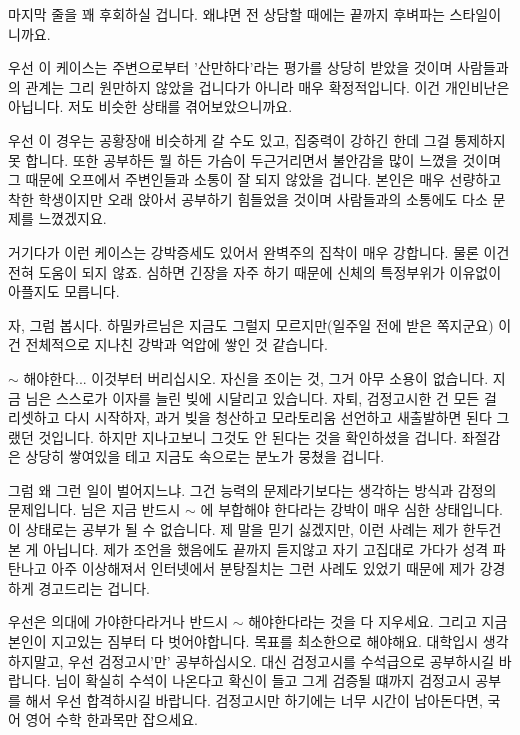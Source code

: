 마지막 줄을 꽤 후회하실 겁니다. 왜냐면 전 상담할 때에는 끝까지 후벼파는 스타일이니까요.
\vspace{5mm}

우선 이 케이스는 주변으로부터 '산만하다'라는 평가를 상당히 받았을 것이며
사람들과의 관계는 그리 원만하지 않았을 겁니다가 아니라 매우 확정적입니다.
이건 개인비난은 아닙니다. 저도 비슷한 상태를 겪어보았으니까요.
\vspace{5mm}

우선 이 경우는 공황장애 비슷하게 갈 수도 있고, 집중력이 강하긴 한데 그걸 통제하지 못 합니다.
또한 공부하든 뭘 하든 가슴이 두근거리면서 불안감을 많이 느꼈을 것이며 그 때문에 오프에서 주변인들과 소통이 잘 되지 않았을 겁니다.
본인은 매우 선량하고 착한 학생이지만 오래 앉아서 공부하기 힘들었을 것이며 사람들과의 소통에도 다소 문제를 느꼈겠지요.
\vspace{5mm}

거기다가 이런 케이스는 강박증세도 있어서 완벽주의 집착이 매우 강합니다. 물론 이건 전혀 도움이 되지 않죠.
심하면 긴장을 자주 하기 때문에 신체의 특정부위가 이유없이 아플지도 모릅니다.
\vspace{5mm}

자, 그럼 봅시다. 하밀카르님은 지금도 그럴지 모르지만(일주일 전에 받은 쪽지군요)
이건 전체적으로 지나친 강박과 억압에 쌓인 것 같습니다.
\vspace{5mm}

$\sim$ 해야한다... 이것부터 버리십시오. 자신을 조이는 것, 그거 아무 소용이 없습니다.
지금 님은 스스로가 이자를 늘린 빚에 시달리고 있습니다.
자퇴, 검정고시한 건 모든 걸 리셋하고 다시 시작하자, 과거 빚을 청산하고 모라토리움 선언하고 새출발하면 된다 그랬던 것입니다.
하지만 지나고보니 그것도 안 된다는 것을 확인하셨을 겁니다. 좌절감은 상당히 쌓여있을 테고 지금도 속으로는 분노가 뭉쳤을 겁니다.
\vspace{5mm}

그럼 왜 그런 일이 벌어지느냐.
그건 능력의 문제라기보다는 생각하는 방식과 감정의 문제입니다.
님은 지금 반드시 $\sim$ 에 부합해야 한다라는 강박이 매우 심한 상태입니다.
이 상태로는 공부가 될 수 없습니다.
제 말을 믿기 싫겠지만, 이런 사례는 제가 한두건 본 게 아닙니다.
제가 조언을 했음에도 끝까지 듣지않고 자기 고집대로 가다가 성격 파탄나고 아주 이상해져서
인터넷에서 분탕질치는 그런 사례도 있었기 때문에 제가 강경하게 경고드리는 겁니다.
\vspace{5mm}

우선은 의대에 가야한다라거나 반드시 $\sim$ 해야한다라는 것을 다 지우세요.
그리고 지금 본인이 지고있는 짐부터 다 벗어야합니다. 목표를 최소한으로 해야해요.
대학입시 생각하지말고, 우선 검정고시'만' 공부하십시오. 대신 검정고시를 수석급으로 공부하시길 바랍니다.
님이 확실히 수석이 나온다고 확신이 들고 그게 검증될 떄까지 검정고시 공부를 해서 우선 합격하시길 바랍니다.
검정고시만 하기에는 너무 시간이 남아돈다면, 국어 영어 수학 한과목만 잡으세요.
\vspace{5mm}

